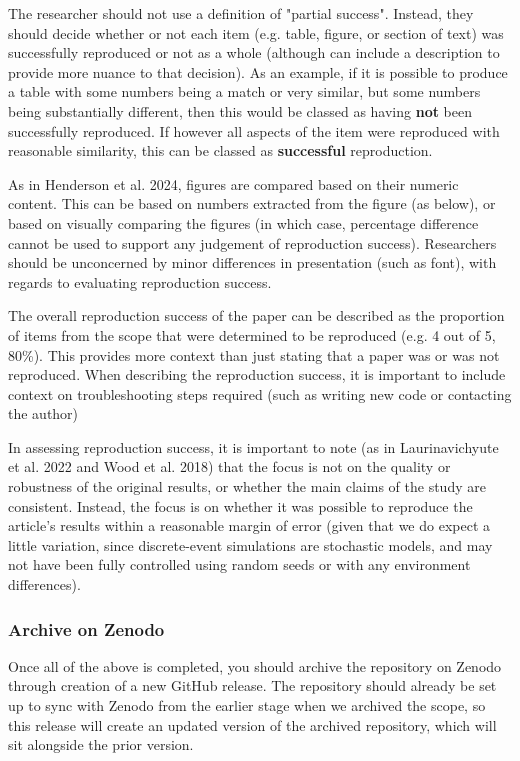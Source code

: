 The researcher should not use a definition of "partial success". Instead, they should decide whether or not each item (e.g. table, figure, or section of text) was successfully reproduced or not as a whole (although can include a description to provide more nuance to that decision). As an example, if it is possible to produce a table with some numbers being a match or very similar, but some numbers being substantially different, then this would be classed as having \textbf{not} been successfully reproduced. If however all aspects of the item were reproduced with reasonable similarity, this can be classed as \textbf{successful} reproduction.

As in Henderson et al. 2024,\autocite{henderson_reproducibility_2024} figures are compared based on their numeric content. This can be based on numbers extracted from the figure (as below), or based on visually comparing the figures (in which case, percentage difference cannot be used to support any judgement of reproduction success). Researchers should be unconcerned by minor differences in presentation (such as font), with regards to evaluating reproduction success.

The overall reproduction success of the paper can be described as the proportion of items from the scope that were determined to be reproduced (e.g. 4 out of 5, 80\%). This provides more context than just stating that a paper was or was not reproduced. When describing the reproduction success, it is important to include context on troubleshooting steps required (such as writing new code or contacting the author)

In assessing reproduction success, it is important to note (as in Laurinavichyute et al. 2022\autocite{laurinavichyute_share_2022} and Wood et al. 2018\autocite{wood_push_2018}) that the focus is not on the quality or robustness of the original results, or whether the main claims of the study are consistent. Instead, the focus is on whether it was possible to reproduce the article's results within a reasonable margin of error (given that we do expect a little variation, since discrete-event simulations are stochastic models, and may not have been fully controlled using random seeds or with any environment differences).

\subsubsection{Archive on Zenodo}
\timeyes

Once all of the above is completed, you should archive the repository on Zenodo through creation of a new GitHub release. The repository should already be set up to sync with Zenodo from the earlier stage when we archived the scope, so this release will create an updated version of the archived repository, which will sit alongside the prior version.